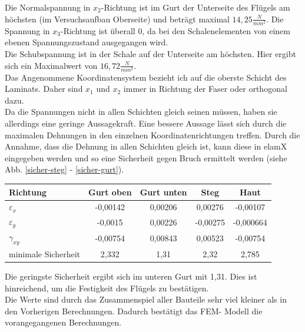 Die Normalspannung in $x_{2}$-Richtung ist im Gurt der Unterseite des Flügels am höchsten (im Versuchsaufbau Oberseite) und beträgt maximal $14,25\frac{N}{mm^2}$. Die Spannung in $x_{3}$-Richtung ist überall 0, da bei den Schalenelementen von einem ebenen Spannungszustand ausgegangen wird.\\
Die Schubspannung ist in der Schale auf der Unterseite am höchsten. Hier ergibt sich ein Maximalwert von $16,72\frac{N}{mm^2}$.\\
\noindent
Das Angenommene Koordinatensystem bezieht ich auf die oberste Schicht des Laminats. Daher sind $x_{1}$ und $x_{2}$ immer in Richtung der Faser oder orthogonal dazu.\\
Da die Spannungen nicht in allen Schichten gleich seinen müssen, haben sie allerdings eine geringe Aussagekraft. Eine bessere Aussage lässt sich durch die maximalen Dehnungen in den einzelnen Koordinatenrichtungen treffen. Durch die Annahme, dass die Dehnung in allen Schichten gleich ist, kann diese in elamX eingegeben werden und so eine Sicherheit gegen Bruch ermittelt werden
(siehe Abb. \ref{sicher-steg} - \ref{sicher-gurt}).
\begin{center}
\begin{tabular}[h]{l|c|c|c|c}
Richtung&Gurt oben&Gurt unten&Steg&Haut\\
\hline
$\varepsilon_{x}$&-0,00142&0,00206&0,00276&-0,00107\\
$\varepsilon_{y}$&-0,0015&0,00226&-0,00275&-0,000664\\
$\gamma_{xy}$&-0,00754&0,00843&0,00523&-0,00754\\
minimale Sicherheit&2,332&1,31&2,32&2,785
\end{tabular}
\end{center}

\noindent
Die geringste Sicherheit ergibt sich im unteren Gurt mit 1,31. Dies ist hinreichend, um die Festigkeit des Flügels zu bestätigen.\\
\noindent
Die Werte sind durch das Zusammenspiel aller Bauteile sehr viel kleiner als in den Vorherigen Berechnungen. Dadurch bestätigt das FEM- Modell die vorangegangenen Berechnungen.
\newpage
